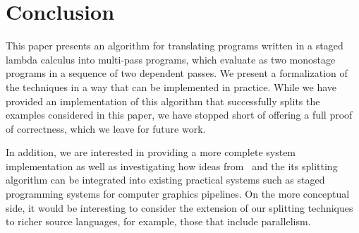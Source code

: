 \section{Conclusion}

This paper presents an algorithm for translating programs written in a
staged lambda calculus into multi-pass programs, which evaluate as two
monostage programs in a sequence of two dependent passes. We present a
formalization of the techniques in a way that can be implemented in
practice.  While we have provided an implementation of this algorithm
that successfully splits the examples considered in this paper, we
have stopped short of offering a full proof of correctness, which we
leave for future work. 

In addition, we are interested in providing a more complete system
implementation as well as investigating how ideas from \lang\ and the
its splitting algorithm can be integrated into existing practical
systems such as staged programming systems for computer graphics
pipelines.  On the more conceptual side, it would be interesting to
consider the extension of our splitting techniques to richer source
languages, for example, those that include parallelism.

